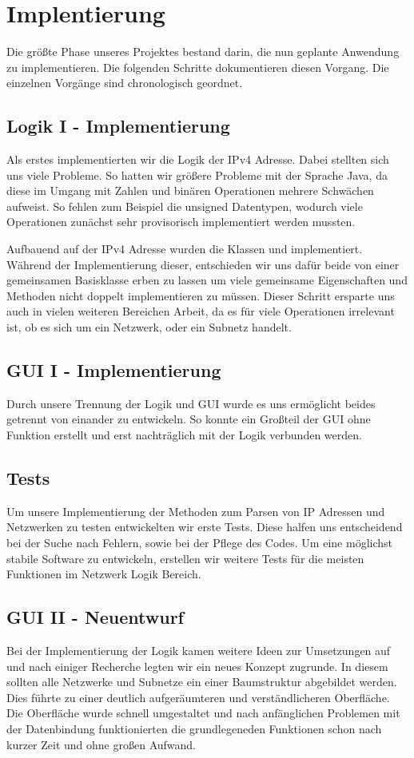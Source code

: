\section{Implentierung}
Die größte Phase unseres Projektes bestand darin, die nun geplante Anwendung zu implementieren.
Die folgenden Schritte dokumentieren diesen Vorgang. Die einzelnen Vorgänge sind chronologisch geordnet.

\subsection{Logik I - Implementierung}
Als erstes implementierten wir die Logik der IPv4 Adresse. Dabei stellten sich uns viele
Probleme. So hatten wir größere Probleme mit der Sprache Java, da diese im Umgang mit
Zahlen und binären Operationen mehrere Schwächen aufweist. So fehlen zum Beispiel die
unsigned Datentypen, wodurch viele Operationen zunächst sehr provisorisch implementiert
werden mussten.

Aufbauend auf der IPv4 Adresse wurden die Klassen  und  implementiert.
Während der Implementierung dieser, entschieden wir uns dafür beide von einer gemeinsamen Basisklasse
 erben zu lassen um viele gemeinsame Eigenschaften und Methoden nicht doppelt
implementieren zu müssen.
Dieser Schritt ersparte uns auch in vielen weiteren Bereichen Arbeit, da es für viele Operationen
irrelevant ist, ob es sich um ein Netzwerk, oder ein Subnetz handelt.

\subsection{GUI I - Implementierung}
Durch unsere Trennung der Logik und GUI wurde es uns ermöglicht beides getrennt von einander
zu entwickeln. So konnte ein Großteil der GUI ohne Funktion erstellt und erst nachträglich
mit der Logik verbunden werden.

\subsection{Tests}
Um unsere Implementierung der Methoden zum Parsen von IP Adressen und Netzwerken zu testen entwickelten
wir erste Tests. Diese halfen uns entscheidend bei der Suche nach Fehlern, sowie bei der Pflege des Codes.
Um eine möglichst stabile Software zu entwickeln, erstellen wir weitere Tests für die meisten Funktionen
im Netzwerk Logik Bereich. 

\subsection{GUI II - Neuentwurf}
Bei der Implementierung der Logik kamen weitere Ideen zur Umsetzungen auf und nach einiger Recherche
legten wir ein neues Konzept zugrunde. In diesem sollten alle Netzwerke und Subnetze ein einer
Baumstruktur abgebildet werden. Dies führte zu einer deutlich aufgeräumteren und
verständlicheren Oberfläche.
Die Oberfläche wurde schnell umgestaltet und nach anfänglichen Problemen mit der Datenbindung
funktionierten die grundlegeneden Funktionen schon nach kurzer Zeit und ohne großen Aufwand.

